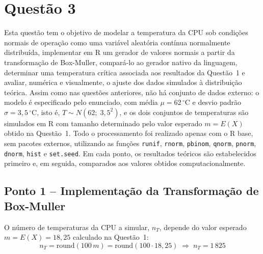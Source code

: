 \documentclass[10pt,a4paper]{article}
\begin{document}
\section{Questão 3}

Esta questão tem o objetivo de modelar a temperatura da CPU sob condições normais de operação como uma variável aleatória contínua normalmente distribuída, implementar em R um gerador de valores normais a partir da transformação de Box-Muller, compará-lo ao gerador nativo da linguagem, determinar uma temperatura crítica associada aos resultados da Questão~1 e avaliar, numérica e visualmente, o ajuste dos dados simulados à distribuição teórica. Assim como nas questões anteriores, não há conjunto de dados externo: o modelo é especificado pelo enunciado, com média $\mu = 62\,^\circ\text{C}$ e desvio padrão $\sigma = 3{,}5\,^\circ\text{C}$, isto é, $T \sim N(62;\; 3{,}5^{2})$, e os dois conjuntos de temperaturas são simulados em R com tamanho determinado pelo valor esperado $m = E(X)$ obtido na Questão~1. Todo o processamento foi realizado apenas com o R base, sem pacotes externos, utilizando as funções \texttt{runif}, \texttt{rnorm}, \texttt{pbinom}, \texttt{qnorm}, \texttt{pnorm}, \texttt{dnorm}, \texttt{hist} e \texttt{set.seed}. Em cada ponto, os resultados teóricos são estabelecidos primeiro e, em seguida, comparados aos valores obtidos computacionalmente.

\subsection{Ponto 1 -- Implementação da Transformação de Box-Muller}

O número de temperaturas da CPU a simular, $n_T$, depende do valor esperado $m = E(X) = 18{,}25$ calculado na Questão~1:
\[
n_T = \text{round}(100\,m) = \text{round}(100 \cdot 18{,}25) \;\Longrightarrow\; \boxed{n_T = 1\,825}
\]
\end{document}
